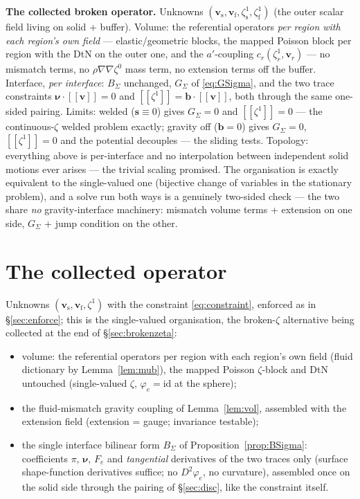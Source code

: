 \documentclass[11pt]{article}
\newcommand{\bnu}{\bm{\nu}}
\newcommand{\bs}{\mathbf{s}}
\newcommand{\bv}{\mathbf{v}}
\newcommand{\jump}[1]{[\![#1]\!]}
\begin{document}
\textbf{The collected broken operator.} Unknowns
$(\bv_{\mathrm{s}}, \bv_{\mathrm{f}}, \zeta_{\mathrm{s}}^1,
\zeta_{\mathrm{f}}^1)$ (the outer scalar field living on solid +
buffer). Volume: the referential operators \emph{per region with each
region's own field} --- elastic/geometric blocks, the mapped Poisson
block per region with the DtN on the outer one, and the
$a'$-coupling $c_r(\zeta_r^1, \bv_r)$ --- no mismatch terms, no
$\rho\nabla\nabla\zeta^0$ mass term, no extension terms off the
buffer. Interface, \emph{per interface}: $B_\Sigma$ unchanged,
$G_\Sigma$ of \eqref{eq:GSigma}, and the two trace constraints
$\bnu\cdot\jump{\bv} = 0$ and $\jump{\zeta^1} =
\mathbf{b}\cdot\jump{\bv}$, both through the same one-sided pairing.
Limits: welded ($\bs \equiv 0$) gives $G_\Sigma = 0$ and
$\jump{\zeta^1} = 0$ --- the continuous-$\zeta$ welded problem
exactly; gravity off ($\mathbf{b} = 0$) gives $G_\Sigma = 0$,
$\jump{\zeta^1} = 0$ and the potential decouples --- the sliding
tests. Topology: everything above is per-interface and no
interpolation between independent solid motions ever arises --- the
trivial scaling promised. The organisation is exactly equivalent to
the single-valued one (bijective change of variables in the
stationary problem), and a solve run both ways is a genuinely
two-sided check --- the two share \emph{no} gravity-interface
machinery: mismatch volume terms + extension on one side, $G_\Sigma$
+ jump condition on the other.

\section{The collected operator}
\label{sec:collect}

Unknowns $(\bv_{\mathrm{s}}, \bv_{\mathrm{f}}, \zeta^1)$ with the
constraint \eqref{eq:constraint}, enforced as in \S\ref{sec:enforce};
this is the single-valued organisation, the broken-$\zeta$ alternative
being collected at the end of \S\ref{sec:brokenzeta}:
\begin{itemize}
\item volume: the referential operators per region with each region's
  own field (fluid dictionary by Lemma~\ref{lem:mub}), the mapped
  Poisson $\zeta$-block and DtN untouched (single-valued $\zeta$,
  $\varphi_e = \mathrm{id}$ at the sphere);
\item the fluid-mismatch gravity coupling of Lemma~\ref{lem:vol},
  assembled with the extension field (extension = gauge; invariance
  testable);
\item the single interface bilinear form $B_\Sigma$ of
  Proposition~\ref{prop:BSigma}: coefficients $\pi$, $\bnu$, $F_e$ and
  \emph{tangential} derivatives of the two traces only (surface
  shape-function derivatives suffice; no $D^2\varphi_e$, no curvature),
  assembled once on the solid side through the pairing of
  \S\ref{sec:disc}, like the constraint itself.
\end{itemize}
\end{document}
